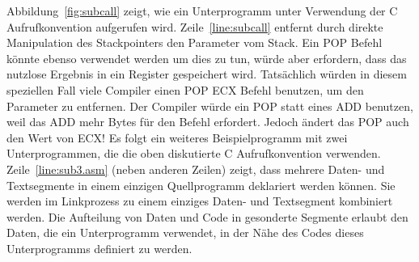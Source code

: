 Abbildung~\ref{fig:subcall} zeigt, wie ein Unterprogramm unter
Verwendung der C Aufrufkonvention aufgerufen wird.
Zeile~\ref{line:subcall} entfernt durch direkte Manipulation des
Stackpointers den Parameter vom Stack. Ein {\code POP} Befehl k\"{o}nnte
ebenso verwendet werden um dies zu tun, w\"{u}rde aber erfordern, dass
das nutzlose Ergebnis in ein Register gespeichert wird. Tats\"{a}chlich
w\"{u}rden in diesem speziellen Fall viele Compiler einen {\code POP
ECX} Befehl benutzen, um den Parameter zu entfernen. Der Compiler
w\"{u}rde ein {\code POP} statt eines {\code ADD} benutzen, weil das
{\code ADD} mehr Bytes f\"{u}r den Befehl erfordert. Jedoch \"{a}ndert das
{\code POP} auch den Wert von ECX! Es folgt ein weiteres
Beispielprogramm mit zwei Unterprogrammen, die die oben diskutierte
C Aufrufkonvention verwenden. Zeile~\ref{line:sub3.asm} (neben
anderen Zeilen) zeigt, dass mehrere Daten- und Textsegmente in einem
einzigen Quellprogramm deklariert werden k\"{o}nnen. Sie werden im
Linkprozess zu einem einziges Daten- und Textsegment kombiniert
werden. Die Aufteilung von Daten und Code in gesonderte Segmente
erlaubt den Daten, die ein Unterprogramm verwendet, in der N\"{a}he des
Codes dieses Unterprogramms definiert zu werden.

